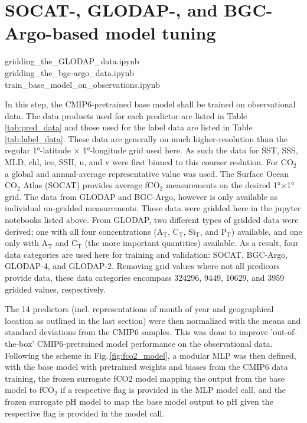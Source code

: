 \documentclass{article}
\begin{document}
	\section{SOCAT-, GLODAP-, and BGC-Argo-based model tuning}
	\begin{tcolorbox}[colback=gray!5!white, colframe=black!75!white, 
	fonttitle=\bfseries, title=Jupyter Notebooks, 
	rounded corners, width=\textwidth]
	gridding\_the\_GLODAP\_data.ipynb \\
	gridding\_the\_bgc-argo\_data.ipynb \\
	train\_base\_model\_on\_observations.ipynb
	\end{tcolorbox}
	In this step, the CMIP6-pretrained base model shall be trained on observational data. The data products used for each predictor are listed in Table\,\ref{tab:pred_data} and those used for the label data are listed in Table\,\ref{tab:label_data}. These data are generally on much higher-resolution than the regular 1°-latitude $\times$ 1°-longitude grid used here. As such the data for SST, SSS, MLD, chl, ice, SSH, u, and v were first binned to this coarser reslution. For CO$_2$ a global and annual-average representative value was used. The Surface Ocean CO$_2$ Atlas (SOCAT) provides average fCO$_2$ measurements on the desired 1°$\times$1° grid. The data from GLODAP and BGC-Argo, however is only available as individual un-gridded measurements. These data were gridded here in the jupyter notebooks listed above. From GLODAP, two different types of gridded data were derived; one with all four concentrations (A$_\text{T}$, C$_\text{T}$, Si$_\text{T}$, and P$_\text{T}$) available, and one only with A$_\text{T}$ and C$_\text{T}$ (the more important quantities) available. As a result, four data categories are used here for training and validation: SOCAT, BGC-Argo, GLODAP-4, and GLODAP-2. Removing grid values where not all predicors provide data, these data categories encompass 324296, 9449, 10629, and 3959 gridded values, respectively. 
	
	The 14 predictors (incl. representations of month of year and geographical location as outlined in the last section) were then normalized with the means and standard deviations from the CMIP6 samples. This was done to improve 'out-of-the-box' CMIP6-pretrained model performance on the observational data. Following the scheme in Fig.\,\ref{fig:fco2_model}, a modular MLP was then defined, with the base model with pretrained weights and biases from the CMIP6 data training, the frozen surrogate fCO2 model mapping the output from the base model to fCO$_2$ if a respective flag is provided in the MLP model call, and the frozen surrogate pH model to map the base model output to pH given the respective flag is provided in the model call.
	
\end{document}
